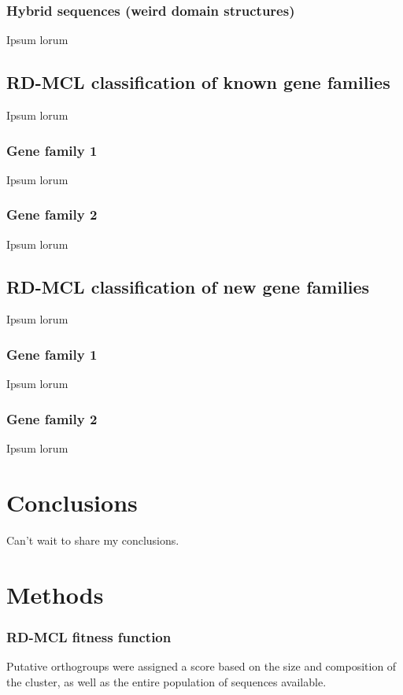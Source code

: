 \documentclass[twocolumn]{bmcart}%
\begin{document}
\subsubsection*{Hybrid sequences (weird domain structures)}
Ipsum lorum

\subsection*{RD-MCL classification of known gene families}
Ipsum lorum

\subsubsection*{Gene family 1}
Ipsum lorum

\subsubsection*{Gene family 2}
Ipsum lorum

\subsection*{RD-MCL classification of new gene families}
Ipsum lorum

\subsubsection*{Gene family 1}
Ipsum lorum

\subsubsection*{Gene family 2}
Ipsum lorum

\section*{Conclusions}
Can't wait to share my conclusions.

\section*{Methods}
\subsubsection*{RD-MCL fitness function}
Putative orthogroups were assigned a score based on the size and composition of the cluster, as well as the entire population of sequences available.
\end{document}
